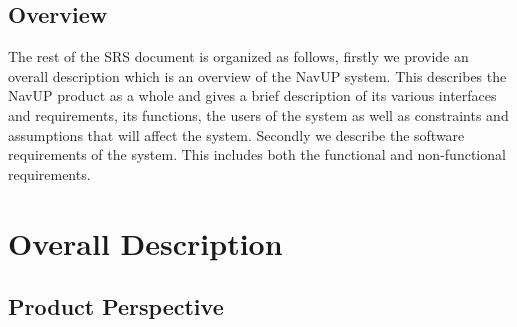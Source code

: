 \documentclass[a4paper,12pt]{article}
\begin{document}
\subsection{Overview}
The rest of the SRS document is organized as follows, firstly we provide an overall description which is an overview of the NavUP system. This describes the NavUP product as a whole and gives a brief description of its various interfaces and requirements, its functions, the users of the system as well as constraints and assumptions that will affect the system. Secondly we describe the software requirements of the system. This includes both the functional and non-functional requirements.

\section{Overall Description}
\subsection{Product Perspective}
\end{document}
